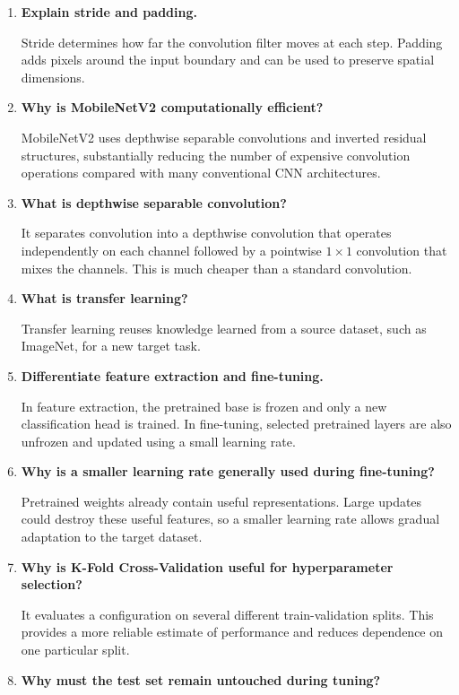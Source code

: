 \documentclass[12pt,a4paper]{article}
\begin{document}
\begin{enumerate}[leftmargin=*]
\item \textbf{Explain stride and padding.}

Stride determines how far the convolution filter moves at each step. Padding
adds pixels around the input boundary and can be used to preserve spatial
dimensions.

\item \textbf{Why is MobileNetV2 computationally efficient?}

MobileNetV2 uses depthwise separable convolutions and inverted residual
structures, substantially reducing the number of expensive convolution
operations compared with many conventional CNN architectures.

\item \textbf{What is depthwise separable convolution?}

It separates convolution into a depthwise convolution that operates
independently on each channel followed by a pointwise $1\times1$ convolution
that mixes the channels. This is much cheaper than a standard convolution.

\item \textbf{What is transfer learning?}

Transfer learning reuses knowledge learned from a source dataset, such as
ImageNet, for a new target task.

\item \textbf{Differentiate feature extraction and fine-tuning.}

In feature extraction, the pretrained base is frozen and only a new
classification head is trained. In fine-tuning, selected pretrained layers are
also unfrozen and updated using a small learning rate.

\item \textbf{Why is a smaller learning rate generally used during fine-tuning?}

Pretrained weights already contain useful representations. Large updates could
destroy these useful features, so a smaller learning rate allows gradual
adaptation to the target dataset.

\item \textbf{Why is K-Fold Cross-Validation useful for hyperparameter selection?}

It evaluates a configuration on several different train-validation splits.
This provides a more reliable estimate of performance and reduces dependence
on one particular split.

\item \textbf{Why must the test set remain untouched during tuning?}


\end{enumerate}
\end{document}
